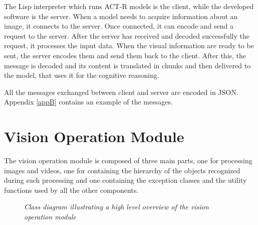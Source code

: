 	The \mbox{Lisp} interpreter which runs \mbox{ACT-R} models is the client, while the developed software is the server.  	
	When a model needs to acquire information about an image, it connects to the server. 
	Once connected, it can encode and send a request to the server. 
	After the server has received and decoded successfully the request, it processes the input data. When the visual information are ready to be sent, the server encodes them and send them back to the client. 
	After this, the message is decoded and its content is translated in chunks and then delivered to the model, that uses it for the cognitive reasoning.

	All the messages exchanged between client and server are encoded in \mbox{JSON}. 
	Appendix \ref{appB} contains an example of the messages.


	\section{Vision Operation Module}
	The vision operation module is composed of three main parts, one for processing images and videos, one for containing the hierarchy of the objects recognized during such processing and one containing the exception classes and the utility functions used by all the other components.

	\begin{figure}[h]
	  \begin{center} 
	  \end{center} 
	  \caption{\textit{Class diagram illustrating a high level overview of the vision operation module}}  
	  \label{fig:classOverview}
 	\end{figure}

